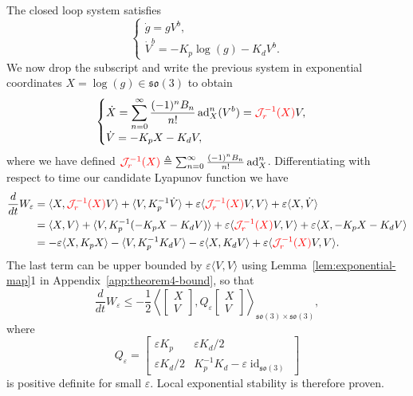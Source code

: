 \documentclass[11pt]{article}
\newcommand{\rev}[1]{\textcolor{red}{#1}}
\newcommand{\JopR}{\mathcal J_r}
\newcommand{\so}{\mathfrak{so}}
\newcommand{\ad}{\operatorname{ad}}
\newcommand{\id}{\operatorname{id}}
\newcommand{\eps}{\varepsilon}
\begin{document}
The closed loop system satisfies
\begin{equation*}
\begin{cases}
\dot g=gV^b,\\
\dot V^b=-K_p\log(g)-K_dV^b.
\end{cases}
\end{equation*}
We now drop the subscript and write the previous system in exponential coordinates $X=\log(g)\in\so(3)$ to obtain
\begin{equation*}
\begin{cases}
\displaystyle \dot X=\sum_{n=0}^{\infty}\frac{(-1)^nB_n}{n!}\ad_X^n(V^b)=\rev{\JopR^{-1}(X)}V,\\[4pt]
\dot V=-K_pX-K_dV,
\end{cases}
\end{equation*}
where we have defined $\rev{\JopR^{-1}(X)}\triangleq\sum_{n=0}^{\infty}\frac{(-1)^nB_n}{n!}\ad_X^n$. Differentiating with respect to time our candidate Lyapunov function we have
\begin{align*}
\frac{d}{dt}W_\eps
&=\langle X,\rev{\JopR^{-1}(X)}V\rangle+\langle V,K_p^{-1}\dot V\rangle
+\eps\langle\rev{\JopR^{-1}(X)}V,V\rangle+\eps\langle X,\dot V\rangle\\
&=\langle X,V\rangle+\langle V,K_p^{-1}(-K_pX-K_dV)\rangle
+\eps\langle\rev{\JopR^{-1}(X)}V,V\rangle+\eps\langle X,-K_pX-K_dV\rangle\\
&=-\eps\langle X,K_pX\rangle-\langle V,K_p^{-1}K_dV\rangle-\eps\langle X,K_dV\rangle
+\eps\langle\rev{\JopR^{-1}(X)}V,V\rangle.
\end{align*}
The last term can be upper bounded by $\eps\langle V,V\rangle$ using Lemma~\ref{lem:exponential-map}1 in Appendix~\ref{app:theorem4-bound}, so that
\begin{equation*}
\frac{d}{dt}W_\eps\le -\frac12\left\langle\begin{bmatrix}X\\V\end{bmatrix},Q_\eps\begin{bmatrix}X\\V\end{bmatrix}\right\rangle_{\so(3)\times\so(3)},
\end{equation*}
where
\begin{equation*}
Q_\eps=\begin{bmatrix}\eps K_p&\eps K_d/2\\\eps K_d/2&K_p^{-1}K_d-\eps\id_{\so(3)}\end{bmatrix}
\end{equation*}
is positive definite for small $\eps$. Local exponential stability is therefore proven.
\end{document}
